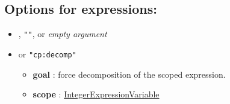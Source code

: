 \subsection{Options for expressions:}
	\begin{itemize}				
		\item {}, \texttt{""}, or \textit{empty argument}
		\item \label{edecomp:edecompoptions}\hypertarget{edecomp:edecompoptions}{}
		 or \texttt{"cp:decomp"}
		\begin{itemize}
				\item \textbf{goal} : force decomposition of the scoped expression.
				\item \textbf{scope} : \hyperlink{model:expressionvariables}{IntegerExpressionVariable}
		\end{itemize}
	\end{itemize}

